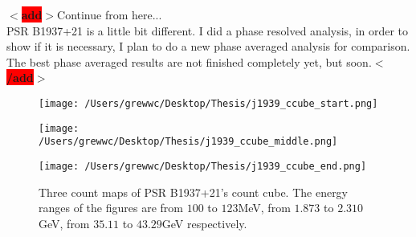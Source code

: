 \documentclass[12pt]{report}
\newcommand{\add}[1]{
  $<$\colorbox{red}{\textbf{add}}$>$#1$<$\colorbox{red}{\textbf{/add}}$>$
}
\begin{document}
          \add{Continue from here... \\
            PSR B1937+21 is a little bit different. I did a phase resolved analysis, 
            in order to show if it is necessary, I plan to do a new phase averaged analysis for 
            comparison. The best phase averaged results are not finished completely yet, but soon.}
          \begin{figure}[!ht]
            \begin{minipage}{0.31\textwidth}
              \begin{center} 
                \texttt{[image: /Users/grewwc/Desktop/Thesis/j1939\_ccube\_start.png]}
              \end{center}
            \end{minipage}
            \begin{minipage}{0.31\textwidth}
              \begin{center}
                \texttt{[image: /Users/grewwc/Desktop/Thesis/j1939\_ccube\_middle.png]}
              \end{center}
            \end{minipage}
            \begin{minipage}{0.31\textwidth}
              \begin{center}
              \texttt{[image: /Users/grewwc/Desktop/Thesis/j1939\_ccube\_end.png]}
              \end{center}
            \end{minipage}
            \caption{Three count maps of PSR B1937+21's count cube. The energy ranges of the 
              figures are from $100$ to $123$MeV, from $1.873$ to $2.310$GeV, from $35.11$ to
              $43.29$GeV respectively.}
            \label{fig: j1939_count_cube}
          \end{figure}
\end{document}
